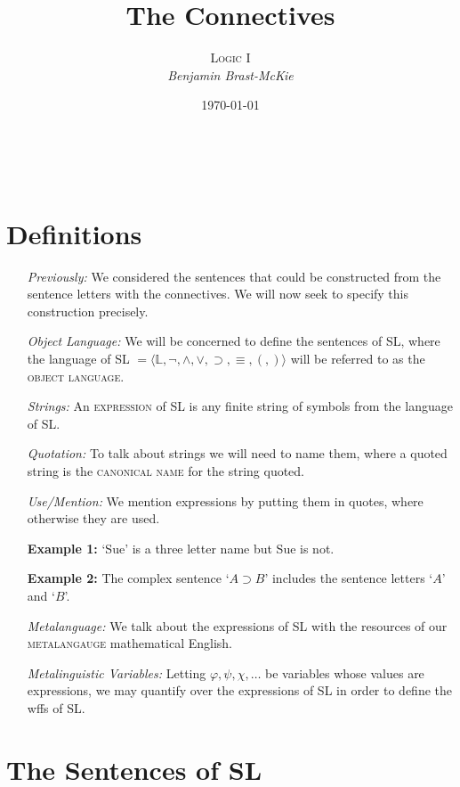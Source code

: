 \documentclass[a4paper, 11pt]{article} %
\title{\textbf{The Connectives}} %
\author{\textsc{Logic I}\\ \em Benjamin Brast-McKie} %
\date{\today} %
\makeatletter
\newcommand{\tuple}[1]{\langle#1\rangle} %
\renewcommand{\maketitle}{ %
\begin{flushright} %
{\LARGE\@title} %

\vspace{10pt} %

{\@author} %
\\\@date %

\vspace{-10pt} %
\end{flushright}
}
\makeatother
\begin{document}
\maketitle %

\thispagestyle{empty}


\section*{Definitions}

\begin{enumerate}[leftmargin=1.5in,labelsep=.15in] %
  \item[\it Previously:] We considered the sentences that could be constructed from the sentence letters with the connectives. We will now seek to specify this construction precisely.
  \item[\it Object Language:] We will be concerned to define the sentences of SL, where the language of SL $=\tuple{\mathbb{L},\neg,\wedge,\vee,\supset,\equiv,(,)}$ will be referred to as the \textsc{object language}.
  \item[\it Strings:] An \textsc{expression} of SL is any finite string of symbols from the language of SL.
  \item[\it Quotation:] To talk about strings we will need to name them, where a quoted string is the \textsc{canonical name} for the string quoted.
  \item[\it Use/Mention:] We mention expressions by putting them in quotes, where otherwise they are used.
  \item[\bf Example 1:] `Sue' is a three letter name but Sue is not.
  \item[\bf Example 2:] The complex sentence `$A \supset B$' includes the sentence letters `$A$' and `$B$'.
  \item[\it Metalanguage:] We talk about the expressions of SL with the resources of our \textsc{metalangauge} mathematical English.
  \item[\it Metalinguistic Variables:] Letting $\varphi,\psi,\chi,\ldots$ be variables whose values are expressions, we may quantify over the expressions of SL in order to define the wffs of SL.
\end{enumerate}




\section*{The Sentences of SL}
\end{document}
